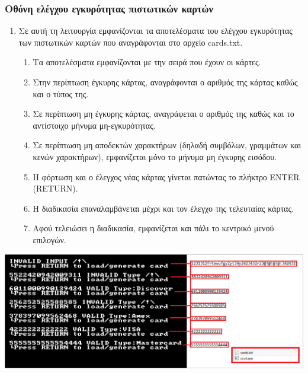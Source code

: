 \documentclass[10pt,a4paper]{article}
\begin{document}
\subsubsection*{Οθόνη ελέγχου εγκυρότητας πιστωτικών καρτών}
\begin{enumerate}
\item Σε αυτή τη λειτουργία εμφανίζονται τα αποτελέσματα του ελέγχου εγκυρότητας των πιστωτικών καρτών που αναγράφονται στο αρχείο \latintext cards.txt\greektext.
	\begin{enumerate}
	\item Τα αποτελέσματα εμφανίζονται με την σειρά που έχουν οι κάρτες.
	\item Στην περίπτωση έγκυρης κάρτας, αναγράφονται ο αριθμός της κάρτας καθώς και ο τύπος της.
	\item Σε περίπτωση μη έγκυρης κάρτας, αναγράφεται ο αριθμός της καθώς και το αντίστοιχο μήνυμα μη-εγκυρότητας.
	\item Σε περίπτωση μη αποδεκτών χαρακτήρων (δηλαδή συμβόλων, γραμμάτων και κενών χαρακτήρων), εμφανίζεται μόνο το μήνυμα μη έγκυρης εισόδου.
	\item Η φόρτωση και ο έλεγχος νέας κάρτας γίνεται πατώντας το πλήκτρο \latintext ENTER (RETURN)\greektext.
	\item Η διαδικασία επαναλαμβάνεται μέχρι και τον έλεγχο της τελευταίας κάρτας.
	\item Αφού τελειώσει η διαδικασία, εμφανίζεται και πάλι το κεντρικό μενού επιλογών.
	\end{enumerate}
\end{enumerate}

\begin{center}
\includegraphics[scale=0.5]{cloaddesc.PNG}
\end{center}

\pagebreak
\end{document}
